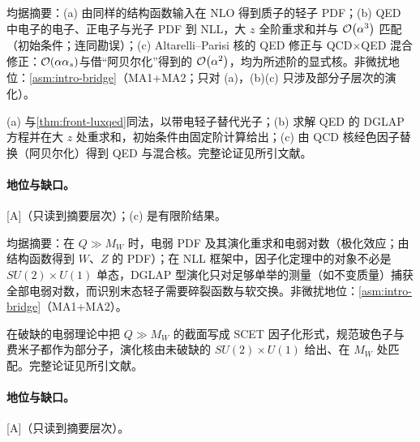 \begin{proposition}\label{prop:front-lepton-pdf}
均据摘要：(a) 由同样的结构函数输入在 NLO 得到质子的轻子 PDF\cite{Buonocore:2020nai}；(b) QED 中电子的电子、正电子与光子 PDF 到 NLL，大 $z$ 全阶重求和并与 $\mathcal{O}\!\left(\alpha^3\right)$ 匹配（初始条件\cite{Frixione:2019lga}；\cite{Bertone:2019hks}连同勘误）；(c) Altarelli--Parisi 核的 QED 修正与 QCD$\times$QED 混合修正：$\mathcal{O}\!\left(\alpha\alpha_s\right)$\cite{deFlorian:2015ujt}与借“阿贝尔化”得到的 $\mathcal{O}\!\left(\alpha^2\right)$\cite{deFlorian:2016gvk}，均为所述阶的显式核。非微扰地位：\cref{asm:intro-bridge}（MA1+MA2；只对 (a)，(b)(c) 只涉及部分子层次的演化）。
\end{proposition}

\begin{proofsketch}
(a) 与\cref{thm:front-luxqed}同法，以带电轻子替代光子；(b) 求解 QED 的 DGLAP 方程并在大 $z$ 处重求和，初始条件由固定阶计算给出；(c) 由 QCD 核经色因子替换（阿贝尔化）得到 QED 与混合核。完整论证见所引文献。
\end{proofsketch}

\paragraph{地位与缺口。}[A]（只读到摘要层次）；(c) 是有限阶结果。

\begin{proposition}\label{prop:front-ew-pdf}
均据摘要：在 $Q\gg M_W$ 时，电弱 PDF 及其演化重求和电弱对数\cite{Bauer:2017isx}（极化效应\cite{Bauer:2018arx}；由结构函数得到 $W$、$Z$ 的 PDF\cite{Fornal:2018znf}）；在 NLL 框架中，因子化定理中的对象不必是 $SU(2)\times U(1)$ 单态，DGLAP 型演化只对足够单举的测量（如不变质量）捕获全部电弱对数，而识别末态轻子需要碎裂函数与软交换\cite{Manohar:2018kfx}。非微扰地位：\cref{asm:intro-bridge}（MA1+MA2）。
\end{proposition}

\begin{proofsketch}
在破缺的电弱理论中把 $Q\gg M_W$ 的截面写成 SCET 因子化形式，规范玻色子与费米子都作为部分子，演化核由未破缺的 $SU(2)\times U(1)$ 给出、在 $M_W$ 处匹配。完整论证见所引文献。
\end{proofsketch}

\paragraph{地位与缺口。}[A]（只读到摘要层次）。

